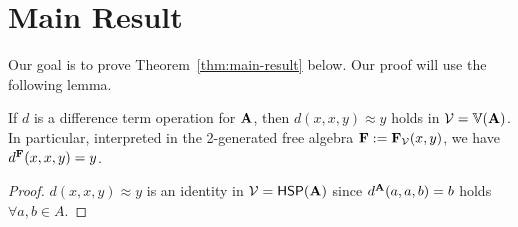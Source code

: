 \section{Main Result}
Our goal is to prove Theorem~\ref{thm:main-result} below. Our proof will use the following lemma.
\begin{lemma}
  If $d$ is a difference term operation for $\mathbf{A}$,
  then $d(x,x,y) \approx y$ holds in $\mathcal{V} = \operatorname{\mathbb{V}}(\mathbf{A})$.
  In particular, interpreted in the 2-generated free algebra
  $\mathbf{F} := \mathbf{F}_{\mathcal{V}}(x,y)$, we have $d^{\mathbf{F}}(x,x,y) = y$.
\end{lemma}
\begin{proof}
  $d(x,x,y) \approx y$ is an identity in
  $\mathcal{V} = \mathsf{H} \mathsf{S} \mathsf{P}(\mathbf{A})$ since 
  $d^{\mathbf{A}}(a,a,b) = b$ holds $\forall a, b \in A$.
\end{proof}



